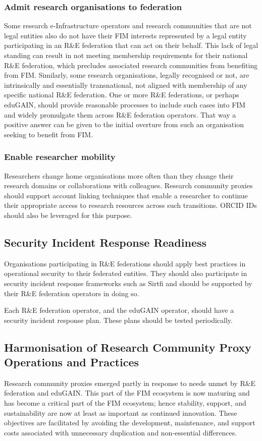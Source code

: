 \documentclass[fleqn,11pt]{wlscirep}
\begin{document}
{\subsubsection{Admit research organisations to federation}
Some research e-Infrastructure operators and research communities that are not legal entities also do not have their FIM interests represented by a legal entity participating in an R\&E federation that can act on their behalf. This lack of legal standing can result in not meeting membership requirements for their national R\&E federation, which precludes associated research communities from benefiting from FIM. Similarly, some research organisations, legally recognised or not, are intrinsically and essentially transnational, not aligned with membership of any specific national R\&E federation. One or more R\&E federations, or perhaps eduGAIN, should provide reasonable processes to include such cases into FIM and widely promulgate them across R\&E federation operators. That way a positive answer can be given to the initial overture from such an organisation seeking to benefit from FIM.

\subsubsection{Enable researcher mobility}
Researchers change home organisations more often than they change their research domains or collaborations with colleagues. Research community proxies should support account linking techniques that enable a researcher to continue their appropriate access to research resources across such transitions. ORCID IDs should also be leveraged for this purpose.

\subsection{Security Incident Response Readiness}
Organisations participating in R\&E federations should apply best practices in operational security to their federated entities. They should also participate in security incident response frameworks such as Sirtfi and should be supported by their R\&E federation operators in doing so.

Each R\&E federation operator, and the eduGAIN operator, should have a security incident response plan. These plans should be tested periodically.

\subsection{Harmonisation of Research Community Proxy Operations and Practices}
Research community proxies emerged partly in response to needs unmet by R\&E federation and eduGAIN. This part of the FIM ecosystem is now maturing and has become a critical part of the FIM ecosystem; hence stability, support, and sustainability are now at least as important as continued innovation. These objectives are facilitated by avoiding the development, maintenance, and support costs associated with unnecessary duplication and non-essential differences.

}
\end{document}
